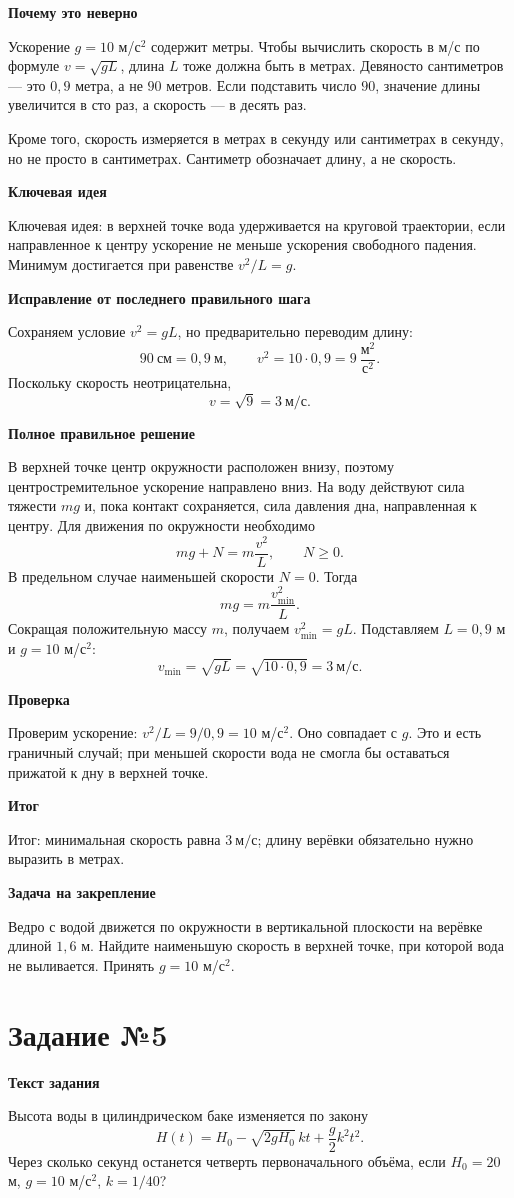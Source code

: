 \documentclass[12pt,a4paper]{article}
\newcommand{\taskheading}[1]{\phantomsection\label{task:#1}\section*{Задание №#1}}
\newcommand{\reviewline}[1]{\par\medskip\textbf{#1}\par\smallskip}
\begin{document}
\reviewline{Почему это неверно}
Ускорение $g=10$ м/с$^2$ содержит метры. Чтобы вычислить скорость в м/с по формуле $v=\sqrt{gL}$, длина $L$ тоже должна быть в метрах. Девяносто сантиметров --- это $0{,}9$ метра, а не $90$ метров. Если подставить число $90$, значение длины увеличится в сто раз, а скорость --- в десять раз.

Кроме того, скорость измеряется в метрах в секунду или сантиметрах в секунду, но не просто в сантиметрах. Сантиметр обозначает длину, а не скорость.

\reviewline{Ключевая идея}
\textcolor{blue!60!black}{Ключевая идея:} в верхней точке вода удерживается на круговой траектории, если направленное к центру ускорение не меньше ускорения свободного падения. Минимум достигается при равенстве $v^2/L=g$.

\reviewline{Исправление от последнего правильного шага}
Сохраняем условие $v^2=gL$, но предварительно переводим длину:
\[
 90\ \text{см}=0{,}9\ \text{м},\qquad
 v^2=10\cdot0{,}9=9\ \frac{\text{м}^2}{\text{с}^2}.
\]
Поскольку скорость неотрицательна,
\[
 v=\sqrt9=3\ \text{м/с}.
\]

\reviewline{Полное правильное решение}
В верхней точке центр окружности расположен внизу, поэтому центростремительное ускорение направлено вниз. На воду действуют сила тяжести $mg$ и, пока контакт сохраняется, сила давления дна, направленная к центру. Для движения по окружности необходимо
\[
 mg+N=m\frac{v^2}{L},\qquad N\ge 0.
\]
В предельном случае наименьшей скорости $N=0$. Тогда
\[
 mg=m\frac{v_{\min}^2}{L}.
\]
Сокращая положительную массу $m$, получаем $v_{\min}^2=gL$. Подставляем $L=0{,}9$ м и $g=10$ м/с$^2$:
\[
 v_{\min}=\sqrt{gL}=\sqrt{10\cdot0{,}9}
=\boxed{3\ \text{м/с}}.
\]

\reviewline{Проверка}
Проверим ускорение: $v^2/L=9/0{,}9=10$ м/с$^2$. Оно совпадает с $g$. Это и есть граничный случай; при меньшей скорости вода не смогла бы оставаться прижатой к дну в верхней точке.

\reviewline{Итог}
\textcolor{teal!60!black}{Итог:} минимальная скорость равна $\boxed{3\ \text{м/с}}$; длину верёвки обязательно нужно выразить в метрах.

\reviewline{Задача на закрепление}
Ведро с водой движется по окружности в вертикальной плоскости на верёвке длиной $1{,}6$ м. Найдите наименьшую скорость в верхней точке, при которой вода не выливается. Принять $g=10$ м/с$^2$.

\newpage
\taskheading{5}
\reviewline{Текст задания}
Высота воды в цилиндрическом баке изменяется по закону
\[
H(t)=H_0-\sqrt{2gH_0}\,kt+\frac{g}{2}k^2t^2.
\]
Через сколько секунд останется четверть первоначального объёма, если $H_0=20$ м, $g=10$ м/с$^2$, $k=1/40$?
\end{document}
